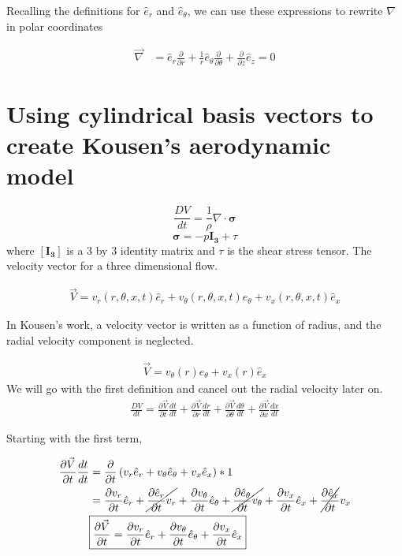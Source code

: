\documentclass[12pt]{article}
\begin{document}
Recalling the definitions for $\hat{e}_r$ and $\hat{e}_{\theta}$, we can use these expressions to rewrite $\nabla$ in polar coordinates

\begin{align*}
	\vec{\nabla} 
	&= \hat{e}_r \frac{\partial} {\partial r} + 
	\frac{1}{r} \hat{e}_{\theta}   
	\frac{\partial} {\partial \theta} + 
	\frac{\partial }{\partial z} \hat{e}_z = 0
\end{align*}
\newpage
\section{Using cylindrical basis vectors to create Kousen's aerodynamic model}


	\[\frac{DV}{dt}                                               = \frac{1}{\rho} \nabla \cdot \boldsymbol{\sigma}\]
	\[\boldsymbol{\sigma}                                         = -p\boldsymbol{I_3}+ \tau\]
where $\boldsymbol{[I_3]}$ is a 3 by 3 identity matrix and $\tau$ is the shear stress tensor. The velocity vector for a three dimensional flow.

\begin{align}
\vec{V} =
v_r(r,\theta,x,t) \hat{e}_r +
v_{\theta}(r,\theta,x,t) \hat{e}_{\theta} +
v_x(r,\theta,x,t) \hat{e}_x
\end{align}

In Kousen's work, a velocity vector is written as a function of radius, and the radial velocity component is neglected.

\begin{align}
\vec{V} = v_{\theta}(r) \hat{e}_{\theta} +
v_x(r) \hat{e}_x
\end{align}
We will go with the first definition and cancel out the radial velocity later on.
\begin{align*}
	\frac{DV}{dt} =
	\frac{\partial \vec{V}}{ \partial t}\frac{dt}{dt} +
	\frac{\partial \vec{V}}{ \partial r}\frac{dr}{dt} +
	\frac{\partial \vec{V}}{ \partial \theta}\frac{d\theta}{dt} +
	\frac{\partial \vec{V}}{ \partial x}\frac{dx}{dt} 
\end{align*}


Starting with the first term,

\begin{align*}
	\frac{\partial \vec{V}}{ \partial t}\frac{dt}{dt}	
	&= \frac{\partial}{\partial t}
	\left(
	v_r 	   \hat{e}_r +
	v_{\theta} \hat{e}_{\theta} +
	v_x		   \hat{e}_x
	\right) * 1 \\ 
	&=
		\frac{\partial 		  v_r}{\partial t} 		\hat{e}_r +
\cancel{\frac{\partial  \hat{e}_r}{\partial t} 		v_r}       +
		\frac{\partial v_{\theta}}{\partial t}		\hat{e}_{\theta} +
\cancel{\frac{\partial \hat{e}_{\theta}}{\partial t} v_{\theta}}  +
		\frac{\partial v_x}{\partial t}\hat{e}_{x} +
\cancel{\frac{\partial \hat{e}_{x}}{\partial t}}v_x \\  
	&\boxed{
	\frac{\partial \vec{V}}{ \partial t} = 
	\frac{\partial 		  v_r}{\partial t} 		\hat{e}_r +
	\frac{\partial v_{\theta}}{\partial t}		\hat{e}_{\theta} + 
	\frac{\partial v_x}{\partial t}\hat{e}_{x}}
\end{align*}
\end{document}
